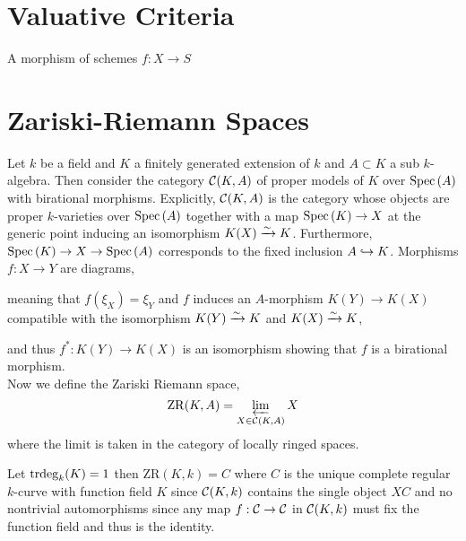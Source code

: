 \documentclass[12pt]{article}
\begin{document}
\section{Valuative Criteria}

\begin{theorem}
A morphism of schemes $f : X \to S$ 
\end{theorem}

\section{Zariski-Riemann Spaces}

\begin{defn}
Let $k$ be a field and $K$ a finitely generated extension of $k$ and $A \subset K$ a sub $k$-algebra. Then consider the category $\mathcal{C}(K, A)$ of proper models of $K$ over $\mathrm{Spec}\left( A \right)$ with birational morphisms. Explicitly, $\mathcal{C}(K, A)$ is the category whose objects are proper $k$-varieties over $\mathrm{Spec}\left( A \right)$ together with a map $\mathrm{Spec}\left( K \right) \to X$ at the generic point inducing an isomorphism $K(X) \xrightarrow{\sim} K$. Furthermore, $\mathrm{Spec}\left( K \right) \to X \to \mathrm{Spec}\left( A \right)$ corresponds to the fixed inclusion $A \hookrightarrow K$. Morphisms $f : X \to Y$ are diagrams,
\begin{center}
\end{center}
meaning that $f(\xi_X) = \xi_Y$ and $f$ induces an $A$-morphism $K(Y) \to K(X)$ compatible with the isomorphism $K(Y) \xrightarrow{\sim} K$ and $K(X) \xrightarrow{\sim} K$,
\begin{center}
\end{center}
and thus $f^* : K(Y) \to K(X)$ is an isomorphism showing that $f$ is a birational morphism.    
\bigskip\\
Now we define the Zariski Riemann space,
\[ \mathrm{ZR}(K, A) = \varprojlim_{X \in \mathcal{C}(K, A)} X \]
where the limit is taken in the category of locally ringed spaces.
\end{defn}

\begin{example}
Let $\mathrm{trdeg}_{k}(K) = 1$ then $\mathrm{ZR}(K, k) = C$ where $C$ is the unique complete regular $k$-curve with function field $K$ since $\mathcal{C}(K, k)$ contains the single object $XC$ and no nontrivial automorphisms since any map $f : \mathcal{C} \to \mathcal{C}$ in $\mathcal{C}(K, k)$ must fix the function field and thus is the identity. 
\end{example}
\end{document}
